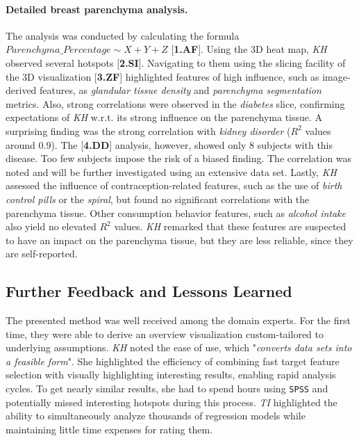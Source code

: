 \documentclass[journal]{style/vgtc} 			          %
\begin{document}
\paragraph{Detailed breast parenchyma analysis.}
The analysis was conducted by calculating the formula $Parenchyma\_Percentage \sim X + Y + Z$ [\textbf{1.AF}].
Using the 3D heat map, \emph{KH} observed several hotspots [\textbf{2.SI}].
Navigating to them using the slicing facility of the 3D visualization [\textbf{3.ZF}] highlighted features of high influence, such as image-derived features, as \emph{glandular tissue density} and \emph{parenchyma segmentation} metrics.
Also, strong correlations were observed in the \emph{diabetes} slice, confirming expectations of \emph{KH} w.r.t. its strong influence on the parenchyma tissue.
A surprising finding was the strong correlation with \emph{kidney disorder} ($R^2$ values around $0.9$).
The [\textbf{4.DD}] analysis, however, showed only 8 subjects with this disease.
Too few subjects impose the risk of a biased finding.
The correlation was noted and will be further investigated using an extensive data set.
Lastly, \emph{KH} assessed the influence of contraception-related features, such as the use of \emph{birth control pills} or the \emph{spiral}, but found no significant correlations with the parenchyma tissue.
Other consumption behavior features, such as \emph{alcohol intake} also yield no elevated $R^2$ values.
\emph{KH} remarked that these features are suspected to have an impact on the parenchyma tissue, but they are less reliable, since they are self-reported.
\subsection{Further Feedback and Lessons Learned} \label{Lessons Learned}
The presented method was well received among the domain experts.
For the first time, they were able to derive an overview visualization custom-tailored to underlying assumptions.
\emph{KH} noted the ease of use, which "\emph{converts data sets into a feasible form}".
She highlighted the efficiency of combining fast target feature selection with visually highlighting interesting results, enabling rapid analysis cycles.
To get nearly similar results, she had to spend hours using \texttt{SPSS} and potentially missed interesting hotspots during this process.
\emph{TI} highlighted the ability to simultaneously analyze thousands of regression models while maintaining little time expenses for rating them.
\end{document}
